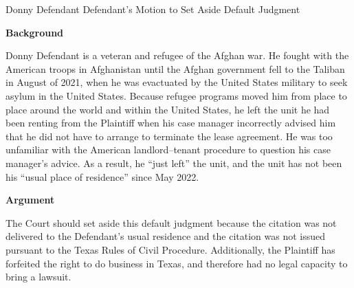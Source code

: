 \documentclass[12pt]{article}
\title{\large\bfseries\centering\MotionTitle\vspace{-36pt}}
\author{}
\date{}
\newcommand{\MotionTitle}{Defendant's Motion to Set Aside Default Judgment}
\begin{document}

\maketitle
\thispagestyle{fancy}

\newcommand{\client}{Donny Defendant}


	{\client}%
	{\MotionTitle %
}%

\pagewiselinenumbers %
\renewcommand{\thesection}{\Roman{section}}
\renewcommand{\thesubsection}{\Alph{subsection}}
\renewcommand{\thesubsubsection}{\arabic{subsubsection}}

\centering
\nolinenumbers{}
\textbf{Background}

\pagewiselinenumbers{}
\justifying
\client{} is a veteran and refugee of the Afghan war. He fought with the American troops in Afghanistan until the Afghan government fell to the Taliban in August of 2021, when he was evactuated by the United States military to seek asylum in the United States. Because refugee programs moved him from place to place around the world and within the United States, he left the unit he had been renting from the Plaintiff when his case manager incorrectly advised him that he did not have to arrange to terminate the lease agreement. He was too unfamiliar with the American landlord--tenant procedure to question his case manager's advice. As a result, he ``just left'' the unit, and the unit has not been his ``usual place of residence'' since May 2022.

\newpage

\centering
\nolinenumbers{}
\textbf{Argument}

\pagewiselinenumbers{}
\justifying

The Court should set aside this default judgment because the citation was not delivered to the Defendant's usual residence and the citation was not issued pursuant to the Texas Rules of Civil Procedure. Additionally, the Plaintiff has forfeited the right to do business in Texas, and therefore had no legal capacity to bring a lawsuit.
\end{document}
